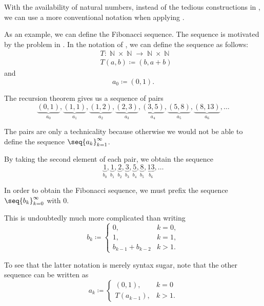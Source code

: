 \begin{remark}\label{rem:natural_number_recursion}
  With the availability of natural numbers, instead of the tedious constructions in , we can use a more conventional notation when applying .

  As an example, we can define the Fibonacci sequence. The sequence is motivated by the problem in . In the notation of , we can define the sequence as follows:
  \begin{equation*}
    \begin{aligned}
      &T: \BbbN \times \BbbN \to \BbbN \times \BbbN \\
      &T(a, b) \coloneqq (b, a + b)
    \end{aligned}
  \end{equation*}
  and
  \begin{equation*}
    a_0 \coloneqq (0, 1).
  \end{equation*}

  The recursion theorem gives us a sequence of pairs
  \begin{equation*}
    \underbrace{(0, 1)}_{a_0}, \underbrace{(1, 1)}_{a_1}, \underbrace{(1, 2)}_{a_2}, \underbrace{(2, 3)}_{a_3}, \underbrace{(3, 5)}_{a_4}, \underbrace{(5, 8)}_{a_5}, \underbrace{(8, 13)}_{a_6}, \ldots
  \end{equation*}

  The pairs are only a technicality because otherwise we would not be able to define the sequence \( \seq{ a_k }_{k=1}^\infty \).

  By taking the second element of each pair, we obtain the sequence
  \begin{equation*}
    \underbrace{1}_{b_0}, \underbrace{1}_{b_1}, \underbrace{2}_{b_2}, \underbrace{3}_{b_3}, \underbrace{5}_{b_4}, \underbrace{8}_{b_5}, \underbrace{13}_{b_6}, \ldots
  \end{equation*}

  In order to obtain the Fibonacci sequence, we must prefix the sequence \( \seq{ b_k }_{k=0}^\infty \) with \( 0 \).

  This is undoubtedly much more complicated than writing
  \begin{equation*}
    b_k \coloneqq \begin{cases}
      0,                &k = 0, \\
      1,                &k = 1, \\
      b_{k-1} + b_{k-2} &k > 1.
    \end{cases}
  \end{equation*}

  To see that the latter notation is merely syntax sugar, note that the other sequence can be written as
  \begin{equation*}
    a_k \coloneqq \begin{cases}
      (0, 1),     &k = 0 \\
      T(a_{k-1}), &k > 1.
    \end{cases}
  \end{equation*}
\end{remark}
